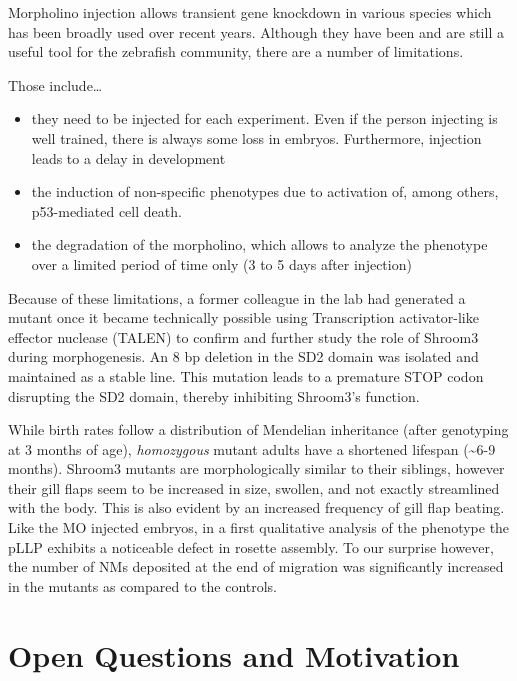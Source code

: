 \documentclass[10pt, b5paper, singlespacinge, twoside]{reedthesis} %
\providecommand{\tightlist}{%
  \setlength{\itemsep}{0pt}\setlength{\parskip}{0pt}}
\theoremstyle{definition}
\theoremstyle{definition}
\theoremstyle{definition}
\theoremstyle{remark}
\begin{document}
Morpholino injection allows transient gene knockdown in various species which has been broadly used over recent years. Although they have been and are still a useful tool for the zebrafish community, there are a number of limitations.

Those include\ldots{}
\begin{itemize}
\tightlist
\item
  they need to be injected for each experiment. Even if the person injecting is well trained, there is always some loss in embryos. Furthermore, injection leads to a delay in development
\item
  the induction of non-specific phenotypes due to activation of, among others, p53-mediated cell death.
\item
  the degradation of the morpholino, which allows to analyze the phenotype over a limited period of time only (3 to 5 days after injection)
\end{itemize}
Because of these limitations, a former colleague in the lab had generated a mutant once it became technically possible using Transcription activator-like effector nuclease (TALEN) to confirm and further study the role of Shroom3 during morphogenesis. An 8 bp deletion in the SD2 domain was isolated and maintained as a stable line. This mutation leads to a premature STOP codon disrupting the SD2 domain, thereby inhibiting Shroom3's function.

While birth rates follow a distribution of Mendelian inheritance (after genotyping at 3 months of age), \emph{homozygous} mutant adults have a shortened lifespan (\textasciitilde6-9 months). Shroom3 mutants are morphologically similar to their siblings, however their gill flaps seem to be increased in size, swollen, and not exactly streamlined with the body. This is also evident by an increased frequency of gill flap beating. Like the MO injected embryos, in a first qualitative analysis of the phenotype the pLLP exhibits a noticeable defect in rosette assembly. To our surprise however, the number of NMs deposited at the end of migration was significantly increased in the mutants as compared to the controls.

\hypertarget{open-questions-and-motivation}{%
\section{Open Questions and Motivation}\label{open-questions-and-motivation}}
\end{document}
